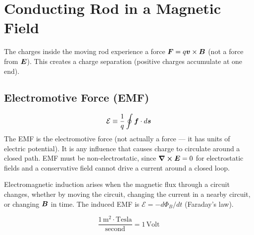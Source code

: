 \section{Conducting Rod in a Magnetic Field}

The charges inside the moving rod experience a force $\vect{F} = q\lvect{v}\times\vect{B}$ (not a force from $\vect{E}$). This creates a charge separation (positive charges accumulate at one end).

\subsection{Electromotive Force (EMF)}

\begin{definition}
\[
    \mathcal{E} \equiv \frac{1}{q}\oint \bm{f}\cdot d\bm{s}
\]
The EMF is the electromotive force (not actually a force --- it has units of electric potential). It is any influence that causes charge to circulate around a closed path. EMF must be non-electrostatic, since $\curl\vect{E} = 0$ for electrostatic fields and a conservative field cannot drive a current around a closed loop.
\end{definition}

Electromagnetic induction arises when the magnetic flux through a circuit changes, whether by moving the circuit, changing the current in a nearby circuit, or changing $\vect{B}$ in time. The induced EMF is $\mathcal{E} = -d\Phi_B/dt$ (Faraday's law).

\begin{fact}
\[
    \frac{1\,\text{m}^2 \cdot \text{Tesla}}{\text{second}} = 1\,\text{Volt}
\]
\end{fact}

